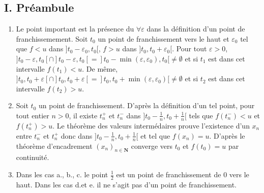 \subsection*{I. Pr{\'e}ambule}
\begin{enumerate}
 \item Le point important est la pr{\'e}sence du $\forall \varepsilon$ dans la d{\'e}finition d'un point de franchissemement.
 Soit $t_{0}$ un point de franchissement vers le haut et $\varepsilon_{0}$ tel que $f<u$ dans $] t_{0}-\varepsilon _{0},t_{0}[ $, $f>u$ dans $] t_{0},t_{0}+\varepsilon _{0}[ $.\newline
 Pour tout $\varepsilon >0$, $] t_{0}-\varepsilon ,t_{0}[ \cap ]t_{0}-\varepsilon ,t_{0}[ =] t_{0}-\min (\varepsilon ,\varepsilon_{0}),t_{0}[ \neq \emptyset$ et si $t_{1}$ est dans cet intervalle $f(t_{1})<u$.
 De m{\^e}me, $] t_{0},t_{0}+\varepsilon [\cap ] t_{0},t_{0}+\varepsilon [ =] t_{0},t_{0}+\min (\varepsilon,\varepsilon _{0})[ \neq \emptyset $ et si $t_{2}$ est dans cet intervalle $f(t_{2})>u$.

  \item  Soit $t_{0}$ un point de franchissement. D'apr{\`e}s la d{\'e}finition d'un tel point, pour tout entier $n>0$, il existe $t_{n}^{+}$ et $t_{n}^{-}$
  dans $]t_{0}-\frac{1}{n},t_{0}+\frac{1}{n}[ $ tels que $f(t_{n}^{-})<u$ et $f(t_{n}^{+})>u$.
  Le th{\'e}or{\`e}me des valeurs interm{\'e}daires prouve l'existence d'un $x_{n}$ entre $t_{n}^{-}$ et $t_{n}^{+}$ donc dans
  $]t_{0}-\frac{1}{n},t_{0}+\frac{1}{n}[ $ et tel que $f(x_{n})=u$.
  D'apr{\`e}s le th{\'e}or{\`e}me d'encadrement $(x_{n})_{n\in \mathbf{N}}$ converge vers $t_{0}$ et $f(t_{0})=u$ par continuit{\'e}.

  \item  Dans les cas a., b., c. le point $\frac{1}{2}$ est un point de franchissement de $0$ vers le haut. Dans les cas d.et e. il ne s'agit pas d'un point de franchissement.


\end{enumerate}
